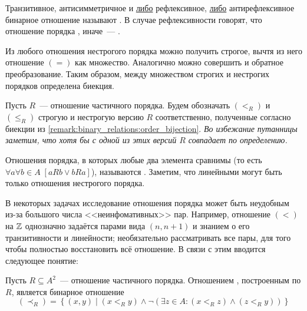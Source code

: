 \begin{definition}
    Транзитивное, антисимметричное и \underline{либо} рефлексивное, \underline{либо} антирефлексивное бинарное отношение называют .
    В случае рефлексивности говорят, что отношение порядка , иначе~--- .
\end{definition}

\begin{remark}
    \label{remark:binary_relations:order_bijection}
    Из любого отношения нестрогого порядка можно получить строгое, вычтя из него отношение $ (=) $ как множество.
    Аналогично можно совершить и обратное преобразование.
    Таким образом, между множеством строгих и нестрогих порядков определена биекция.
\end{remark}

\begin{definition}
    Пусть $ R $~--- отношение частичного порядка.
    Будем обозначать $ (<_R) $ и $ (\leqslant_R) $ строгую и нестрогую версию $ R $ соответственно,
    полученные согласно биекции из \ref{remark:binary_relations:order_bijection}.
    \textit{Во избежание путанницы заметим, что хотя бы с одной из этих версий $ R $ совпадает по определению.}
\end{definition}

\begin{definition}
    Отношения порядка, в которых любые два элемента сравнимы (то есть $ \forall a \forall b \in A \; \left[a R b \vee b R a \right]$),
    называются .
    Заметим, что линейными могут быть только отношения нестрогого порядка.
\end{definition}

В некоторых задачах исследование отношения порядка может быть неудобным из-за большого числа <<неинфомативных>> пар.
Например, отношение $ (<) $ на $ \mathbb{Z} $ однозначно задаётся парами вида $ (n, n+1) $ и знанием о его транзитивности и линейности;
необязательно рассматривать все пары, для того чтобы полностью восстановить всё отношение.
В связи с этим вводится следующее понятие:

\begin{definition}
    Пусть $ R \subseteq A^2 $~--- отношение частичного порядка.
    Отношением , построенным по $ R $, является бинарное отношение
    \[
        (\prec_R) = \left\{ (x, y) \mid (x <_R y) \wedge \neg \left( \exists z \in A: (x <_R z) \wedge (z <_R y) \right) \right\}
    \]
\end{definition}

